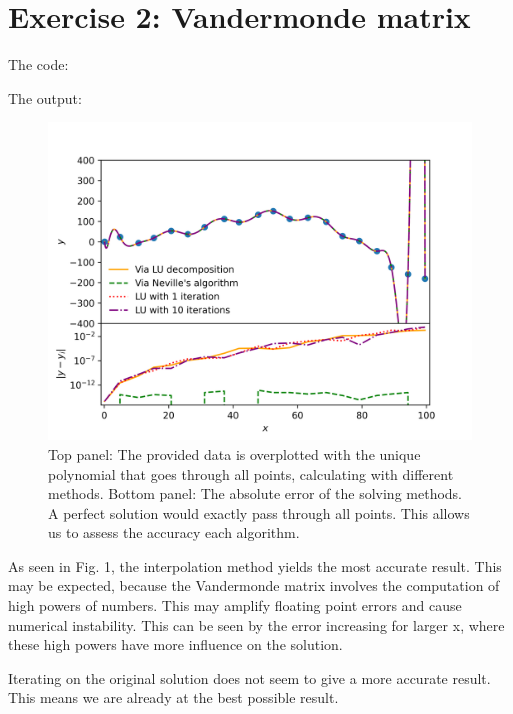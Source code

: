 \section{Exercise 2: Vandermonde matrix}

\noindent The code:



\noindent The output:



\begin{figure}[H]
    \centering
    \includegraphics[width=\textwidth]{plots/my_vandermonde_sol_2c.png}
    \caption{Top panel: The provided data is overplotted with the unique polynomial that goes through all points, calculating with different methods.
    Bottom panel: The absolute error of the solving methods. A perfect solution would exactly pass through all points. This allows us to assess the accuracy 
    each algorithm.
    } \label{fig:vdmonde}
\end{figure}

As seen in Fig. 1, the interpolation method yields the most accurate result. This may be expected, because the Vandermonde matrix 
involves the computation of high powers of numbers. This may amplify floating point errors and cause numerical instability. This can be seen by
the error increasing for larger x, where these high powers have more influence on the solution.

Iterating on the original solution does not seem to give a more accurate result. This means we are already at 
the best possible result.

